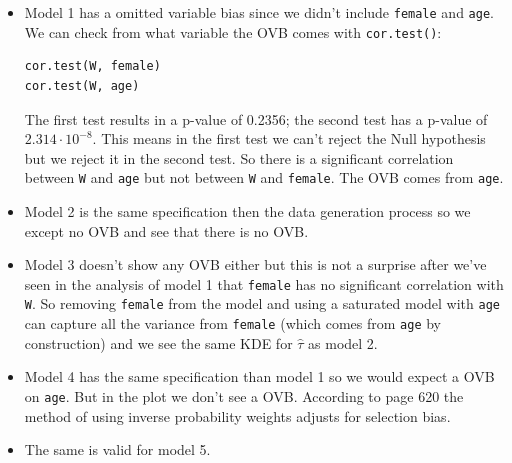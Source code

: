 \documentclass{article}
\begin{document}
	\begin{itemize}
		\item Model 1 has a omitted variable bias since we didn't include \texttt{female} and \texttt{age}. We can check from what variable the OVB comes with \texttt{cor.test()}:
		\begin{lstlisting}
cor.test(W, female)
cor.test(W, age)
		\end{lstlisting}
		The first test results in a p-value of 0.2356; the second test has a p-value of $2.314\cdot 10^{-8}$. This means in the first test we can't reject the Null hypothesis but we reject it in the second test. So there is a significant correlation between \texttt{W} and \texttt{age} but not between \texttt{W} and \texttt{female}. The OVB comes from \texttt{age}.
		\item Model 2 is the same specification then the data generation process so we except no OVB and see that there is no OVB.
		\item Model 3 doesn't show any OVB either but this is not a surprise after we've seen in the analysis of model 1 that \texttt{female} has no significant correlation with \texttt{W}. So removing \texttt{female} from the model and using a saturated model with \texttt{age} can capture all the variance from \texttt{female} (which comes from \texttt{age} by construction) and we see the same KDE for $\hat{\tau}$ as model 2.
		\item Model 4 has the same specification than model 1 so we would expect a OVB on \texttt{age}. But in the plot we don't see a OVB. According to \cite{Hernan2004} page 620 the method of using inverse probability weights adjusts for selection bias.
		\item The same is valid for model 5.
	\end{itemize}
\end{document}
